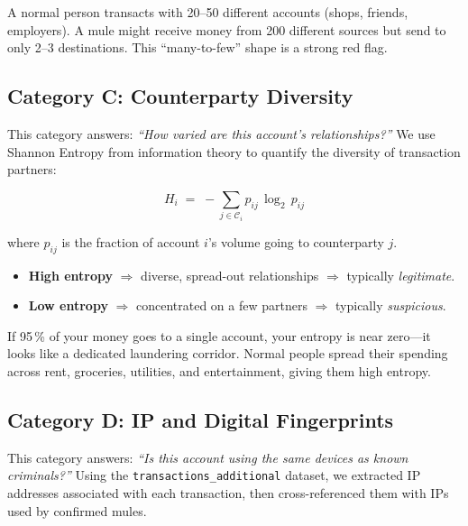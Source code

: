\documentclass[11pt, a4paper]{article}
\begin{document}
\begin{insightbox}
A normal person transacts with 20--50 different accounts (shops, friends, employers). A
mule might receive money from 200 different sources but send to only 2--3 destinations.
This ``many-to-few'' shape is a strong red flag.
\end{insightbox}

\subsection{Category C: Counterparty Diversity}

This category answers: \emph{``How varied are this account's relationships?''} We use
Shannon Entropy from information theory to quantify the diversity of transaction partners:

\begin{equation}
    H_i \;=\; -\sum_{j \in \mathcal{C}_i} p_{ij} \, \log_2 \, p_{ij}
\end{equation}

where $p_{ij}$ is the fraction of account $i$'s volume going to counterparty $j$.

\begin{itemize}[leftmargin=1.5em, itemsep=4pt]
    \item \textbf{High entropy} $\Rightarrow$ diverse, spread-out relationships
          $\Rightarrow$ typically \emph{legitimate}.
    \item \textbf{Low entropy} $\Rightarrow$ concentrated on a few partners
          $\Rightarrow$ typically \emph{suspicious}.
\end{itemize}

\begin{insightbox}
If 95\,\% of your money goes to a single account, your entropy is near zero---it looks like
a dedicated laundering corridor. Normal people spread their spending across rent, groceries,
utilities, and entertainment, giving them high entropy.
\end{insightbox}

\subsection{Category D: IP and Digital Fingerprints}

This category answers: \emph{``Is this account using the same devices as known criminals?''}
Using the \texttt{transactions\_additional} dataset, we extracted IP addresses associated
with each transaction, then cross-referenced them with IPs used by confirmed mules.
\end{document}
